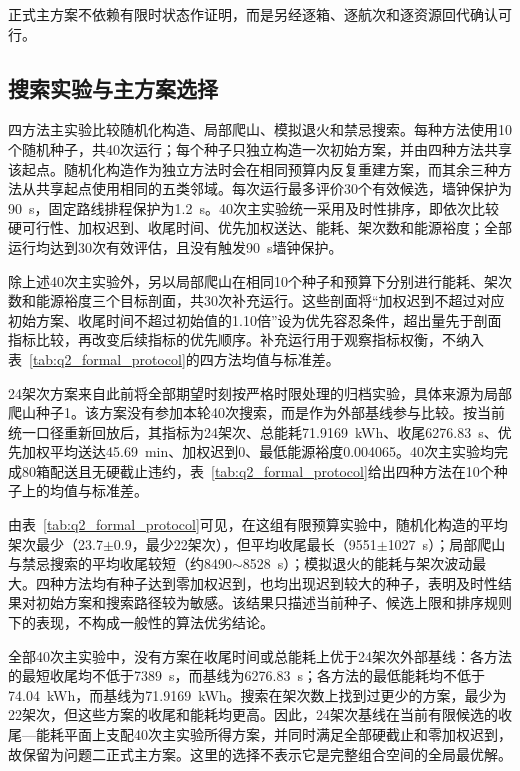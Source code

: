 正式主方案不依赖有限时状态作证明，而是另经逐箱、逐航次和逐资源回代确认可行。

\subsection{搜索实验与主方案选择}

四方法主实验比较随机化构造、局部爬山、模拟退火和禁忌搜索。每种方法使用10个随机种子，共40次运行；每个种子只独立构造一次初始方案，并由四种方法共享该起点。随机化构造作为独立方法时会在相同预算内反复重建方案，而其余三种方法从共享起点使用相同的五类邻域。每次运行最多评价30个有效候选，墙钟保护为90~s，固定路线排程保护为1.2~s。40次主实验统一采用及时性排序，即依次比较硬可行性、加权迟到、收尾时间、优先加权送达、能耗、架次数和能源裕度；全部运行均达到30次有效评估，且没有触发90~s墙钟保护。

除上述40次主实验外，另以局部爬山在相同10个种子和预算下分别进行能耗、架次数和能源裕度三个目标剖面，共30次补充运行。这些剖面将“加权迟到不超过对应初始方案、收尾时间不超过初始值的1.10倍”设为优先容忍条件，超出量先于剖面指标比较，再改变后续指标的优先顺序。补充运行用于观察指标权衡，不纳入表~\ref{tab:q2_formal_protocol}的四方法均值与标准差。

24架次方案来自此前将全部期望时刻按严格时限处理的归档实验，具体来源为局部爬山种子1。该方案没有参加本轮40次搜索，而是作为外部基线参与比较。按当前统一口径重新回放后，其指标为24架次、总能耗71.9169~kWh、收尾6276.83~s、优先加权平均送达45.69~min、加权迟到0、最低能源裕度0.004065。40次主实验均完成80箱配送且无硬截止违约，表~\ref{tab:q2_formal_protocol}给出四种方法在10个种子上的均值与标准差。



由表~\ref{tab:q2_formal_protocol}可见，在这组有限预算实验中，随机化构造的平均架次最少（23.7$\pm$0.9，最少22架次），但平均收尾最长（9551$\pm$1027~s）；局部爬山与禁忌搜索的平均收尾较短（约8490$\sim$8528~s）；模拟退火的能耗与架次波动最大。四种方法均有种子达到零加权迟到，也均出现迟到较大的种子，表明及时性结果对初始方案和搜索路径较为敏感。该结果只描述当前种子、候选上限和排序规则下的表现，不构成一般性的算法优劣结论。

全部40次主实验中，没有方案在收尾时间或总能耗上优于24架次外部基线：各方法的最短收尾均不低于7389~s，而基线为6276.83~s；各方法的最低能耗均不低于74.04~kWh，而基线为71.9169~kWh。搜索在架次数上找到过更少的方案，最少为22架次，但这些方案的收尾和能耗均更高。因此，24架次基线在当前有限候选的收尾—能耗平面上支配40次主实验所得方案，并同时满足全部硬截止和零加权迟到，故保留为问题二正式主方案。这里的选择不表示它是完整组合空间的全局最优解。

